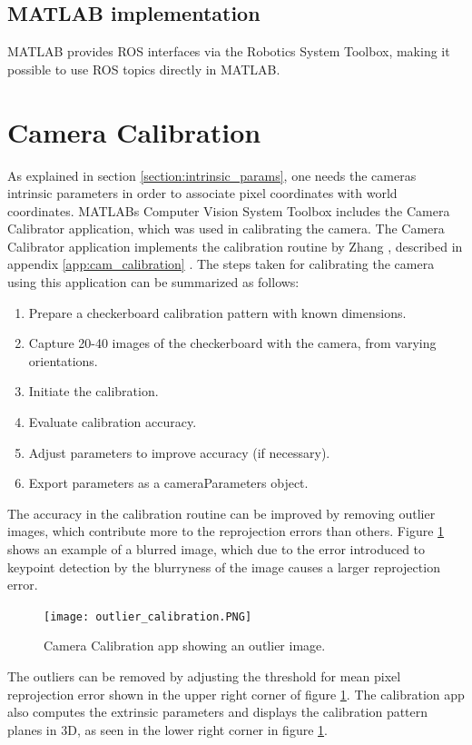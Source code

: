 \subsection{MATLAB implementation}
MATLAB provides ROS interfaces via the Robotics System Toolbox, making it possible to use ROS topics directly in MATLAB. 
\section{Camera Calibration}
\label{section:matlab_calibration}
As explained in section \ref{section:intrinsic_params}, one needs the cameras intrinsic parameters in order to associate pixel coordinates with world coordinates. MATLABs Computer Vision System Toolbox includes the Camera Calibrator application, which was used in calibrating the camera. The Camera Calibrator application implements the calibration routine by Zhang \cite{flexCal}, described in appendix \ref{app:cam_calibration} \cite{camera_calibrator}. The steps taken for calibrating the camera using this application can be summarized as follows:
\begin{enumerate}
	\item Prepare a checkerboard calibration pattern with known dimensions.
	\item Capture 20-40 images of the checkerboard with the camera, from varying orientations.
	\item Initiate the calibration.
	\item Evaluate calibration accuracy.
	\item Adjust parameters to improve accuracy (if necessary).
	\item Export parameters as a cameraParameters object.
\end{enumerate}
The accuracy in the calibration routine can be improved by removing outlier images, which contribute more to the reprojection errors than others. Figure \ref{fig:calib_outlier} shows an example of a blurred image, which due to the error introduced to keypoint detection by the blurryness of the image causes a larger reprojection error.
\begin{figure}[H]
	\centering
	\texttt{[image: outlier\_calibration.PNG]}
	\caption{Camera Calibration app showing an outlier image.}
	\label{fig:calib_outlier}
\end{figure}
The outliers can be removed by adjusting the threshold for mean pixel reprojection error shown in the upper right corner of figure \ref{fig:calib_outlier}. The calibration app also computes the extrinsic parameters and displays the calibration pattern planes in 3D, as seen in the lower right corner in figure \ref{fig:calib_outlier}.
